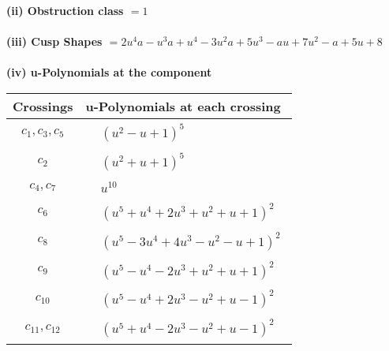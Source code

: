 \documentclass[1p]{elsarticle_modified}
\theoremstyle{definition}
\begin{document}
\flushleft \textbf{(ii) Obstruction class $= 1$}\\~\\
\flushleft \textbf{(iii) Cusp Shapes $= 2 u^4 a- u^3 a+u^4-3 u^2 a+5 u^3- a u+7 u^2- a+5 u+8$}\\~\\
\newpage\renewcommand{\arraystretch}{1}
\flushleft \textbf{(iv) u-Polynomials at the component}\newline \\
\begin{tabular}{m{50pt}|m{274pt}}
Crossings & \hspace{64pt}u-Polynomials at each crossing \\
\hline $$\begin{aligned}c_{1},c_{3},c_{5}\end{aligned}$$&$\begin{aligned}
&(u^2- u+1)^5
\end{aligned}$\\
\hline $$\begin{aligned}c_{2}\end{aligned}$$&$\begin{aligned}
&(u^2+u+1)^5
\end{aligned}$\\
\hline $$\begin{aligned}c_{4},c_{7}\end{aligned}$$&$\begin{aligned}
&u^{10}
\end{aligned}$\\
\hline $$\begin{aligned}c_{6}\end{aligned}$$&$\begin{aligned}
&(u^5+u^4+2 u^3+u^2+u+1)^2
\end{aligned}$\\
\hline $$\begin{aligned}c_{8}\end{aligned}$$&$\begin{aligned}
&(u^5-3 u^4+4 u^3- u^2- u+1)^2
\end{aligned}$\\
\hline $$\begin{aligned}c_{9}\end{aligned}$$&$\begin{aligned}
&(u^5- u^4-2 u^3+u^2+u+1)^2
\end{aligned}$\\
\hline $$\begin{aligned}c_{10}\end{aligned}$$&$\begin{aligned}
&(u^5- u^4+2 u^3- u^2+u-1)^2
\end{aligned}$\\
\hline $$\begin{aligned}c_{11},c_{12}\end{aligned}$$&$\begin{aligned}
&(u^5+u^4-2 u^3- u^2+u-1)^2
\end{aligned}$\\
\hline
\end{tabular}\\~\\
\end{document}
